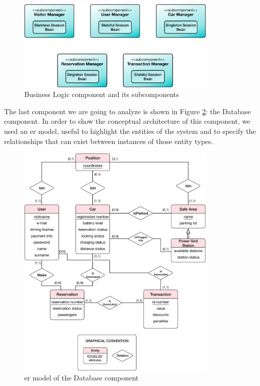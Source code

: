 \begin{figure}[htbp]
\centering
\vspace{104pt}
\includegraphics[width=0.85\textwidth]{Images/BusinessLogicComponent.pdf}
\vspace{10pt}
\caption{Business Logic component and its subcomponents}
\label{fig:business}
\end{figure}
\clearpage

\newline
The last component we are going to analyze is shown in Figure \ref{fig:database}: the Database component. In order to show the conceptual architecture of this component, we used an \acl{er} model, useful to highlight the entities of the system and to specify the relationships that can exist between instances of those entity types.

\begin{figure}[htbp]
\centering
\vspace{24pt}
\includegraphics[width=0.85\textwidth]{Images/DatabaseComponent.pdf}
\vspace{10pt}
\caption{\acs{er} model of the Database component}
\label{fig:database}
\end{figure}
\clearpage

